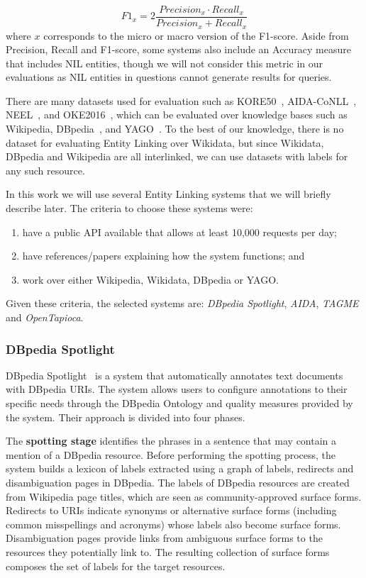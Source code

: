 \[
    F1_x = 2 \frac{Precision_x \cdot Recall_x}{Precision_x + Recall_x}
\]
\noindent where $x$ corresponds to the micro or macro version of the F1-score. Aside from Precision, 
Recall and F1-score, some systems also include an Accuracy measure that includes NIL entities, 
though we will not consider this metric in our evaluations as NIL entities in questions 
cannot generate results for queries.

There are many datasets used for evaluation such as KORE50~\cite{entlin:HoffartSNTW12}, 
AIDA-CoNLL~\cite{EL:aida-HoffartYBFPSTTW11}, NEEL~\cite{entlin:RizzoBPV15}, and 
OKE2016~\cite{entlin:Plu0T16}, which can be evaluated over knowledge bases such as Wikipedia, 
DBpedia~\cite{KG:dbpedia}, and YAGO~\cite{KG:yago}. To the best of our knowledge, there is 
no dataset for evaluating Entity Linking over Wikidata, but since Wikidata, DBpedia and 
Wikipedia are all interlinked, we can use datasets with labels for any such resource.

In this work we will use several Entity Linking systems that we will briefly describe later. 
The criteria to choose these systems were: 

\begin{enumerate}
    \item have a public API available that allows at least 10,000 requests per day; 
    \item have references/papers explaining how the system functions; and 
    \item work over either Wikipedia, Wikidata, DBpedia or YAGO. 
\end{enumerate}

Given these criteria, the selected systems are: \textit{DBpedia Spotlight}, \textit{AIDA}, 
\textit{TAGME} and \textit{OpenTapioca}.

\subsubsection{DBpedia Spotlight}
\label{cap3:infExtr/entityLinking/dbpediaSpotlight}
DBpedia Spotlight~\cite{EL:dbpedia-spotlight-MendesJGB11} is a system that automatically 
annotates text documents with DBpedia URIs. The system allows users to configure annotations 
to their specific needs through the DBpedia Ontology and quality measures provided by the 
system. Their approach is divided into four phases.

The \textbf{spotting stage} identifies the phrases in a sentence that may contain a mention 
of a DBpedia resource. Before performing the spotting process, the system builds a lexicon 
of labels extracted using a graph of labels, redirects and disambiguation pages in 
DBpedia. The labels of DBpedia resources are created from Wikipedia page titles, which are 
seen as community-approved surface forms. Redirects to URIs indicate synonyms or alternative 
surface forms (including common misspellings and acronyms) whose labels also become surface 
forms. Disambiguation pages provide links from ambiguous surface forms to the resources they 
potentially link to. The resulting collection of surface forms composes the set of labels for 
the target resources.

